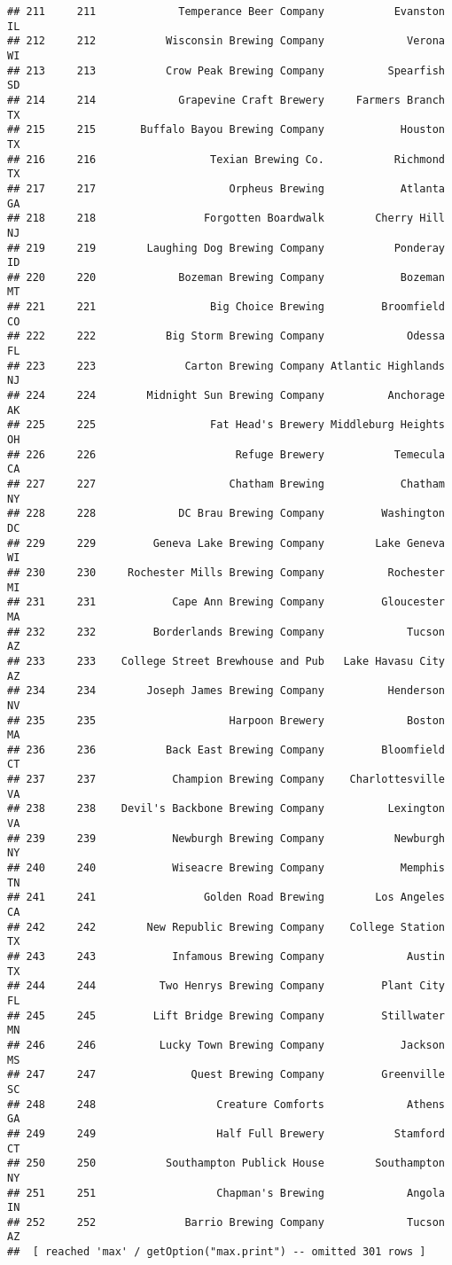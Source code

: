 \documentclass[
]{article}
\begin{document}
\begin{verbatim}
## 211     211             Temperance Beer Company           Evanston    IL
## 212     212           Wisconsin Brewing Company             Verona    WI
## 213     213           Crow Peak Brewing Company          Spearfish    SD
## 214     214             Grapevine Craft Brewery     Farmers Branch    TX
## 215     215       Buffalo Bayou Brewing Company            Houston    TX
## 216     216                  Texian Brewing Co.           Richmond    TX
## 217     217                     Orpheus Brewing            Atlanta    GA
## 218     218                 Forgotten Boardwalk        Cherry Hill    NJ
## 219     219        Laughing Dog Brewing Company           Ponderay    ID
## 220     220             Bozeman Brewing Company            Bozeman    MT
## 221     221                  Big Choice Brewing         Broomfield    CO
## 222     222           Big Storm Brewing Company             Odessa    FL
## 223     223              Carton Brewing Company Atlantic Highlands    NJ
## 224     224        Midnight Sun Brewing Company          Anchorage    AK
## 225     225                  Fat Head's Brewery Middleburg Heights    OH
## 226     226                      Refuge Brewery           Temecula    CA
## 227     227                     Chatham Brewing            Chatham    NY
## 228     228             DC Brau Brewing Company         Washington    DC
## 229     229         Geneva Lake Brewing Company        Lake Geneva    WI
## 230     230     Rochester Mills Brewing Company          Rochester    MI
## 231     231            Cape Ann Brewing Company         Gloucester    MA
## 232     232         Borderlands Brewing Company             Tucson    AZ
## 233     233    College Street Brewhouse and Pub   Lake Havasu City    AZ
## 234     234        Joseph James Brewing Company          Henderson    NV
## 235     235                     Harpoon Brewery             Boston    MA
## 236     236           Back East Brewing Company         Bloomfield    CT
## 237     237            Champion Brewing Company    Charlottesville    VA
## 238     238    Devil's Backbone Brewing Company          Lexington    VA
## 239     239            Newburgh Brewing Company           Newburgh    NY
## 240     240            Wiseacre Brewing Company            Memphis    TN
## 241     241                 Golden Road Brewing        Los Angeles    CA
## 242     242        New Republic Brewing Company    College Station    TX
## 243     243            Infamous Brewing Company             Austin    TX
## 244     244          Two Henrys Brewing Company         Plant City    FL
## 245     245         Lift Bridge Brewing Company         Stillwater    MN
## 246     246          Lucky Town Brewing Company            Jackson    MS
## 247     247               Quest Brewing Company         Greenville    SC
## 248     248                   Creature Comforts             Athens    GA
## 249     249                   Half Full Brewery           Stamford    CT
## 250     250           Southampton Publick House        Southampton    NY
## 251     251                   Chapman's Brewing             Angola    IN
## 252     252              Barrio Brewing Company             Tucson    AZ
##  [ reached 'max' / getOption("max.print") -- omitted 301 rows ]
\end{verbatim}
\end{document}
